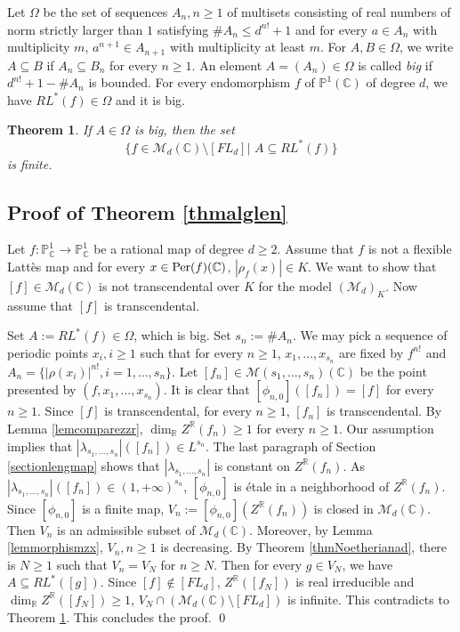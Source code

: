 \documentclass[12pt]{amsart}
\theoremstyle{plain}
\newtheorem{Thm}{Theorem}[section]
\theoremstyle{remark}
\theoremstyle{definition}
\def\R{\mathbb R}
\def\C{\mathbb C}
\def\P{\mathbb P}
\def\sM{\mathcal M}
\def\Om{\Omega}
\def\la{\lambda}
\begin{document}
\medskip



Let $\Om$ be the set of sequences $A_n, n\geq 1$ of multisets consisting of real numbers of norm strictly larger than $1$  satisfying $\#A_n\leq d^{n!}+1$ 
and for every $a\in A_n$ with multiplicity $m$, $a^{n+1}\in A_{n+1}$ with multiplicity at least $m$.
For $A,B\in \Om$, we write $A\subseteq B$ if $A_n\subseteq B_n$ for every $n\geq 1$.
An element $A=(A_n)\in \Om$ is called \emph{big} if $d^{n!}+1-\#A_n$ is bounded. 
For every endomorphism $f$ of $\P^1(\C)$ of degree $d$, we have $RL^*(f)\in \Om$ and it is big.


\begin{Thm}\cite[Theorem 8.25]{Ji2023}\label{thmbigspecrig}
If $A\in \Om$ is big, 
then the set 
$$\{f\in \sM_d(\C)\setminus [FL_d]|\,\, A\subseteq RL^*(f)\}$$ is finite.
\end{Thm}


\subsection{Proof of Theorem \ref{thmalglen}}
Let $f: \P_{\C}^1\to \P_{\C}^1$ be a rational map of degree $d\geq 2$.
Assume that  $f$ is not a flexible Latt\`es map and  for every $x\in {\rm Per}(f)(\C)$, $|\rho_f(x)|\in K$. 
We want to show that $[f]\in \sM_d(\C)$ is not transcendental over $K$ for the model $(\sM_d)_K.$
Now assume that $[f]$ is transcendental.
\medskip

Set $A:=RL^*(f)\in \Om$, which is big. Set $s_n:=\#A_n.$ We may pick a sequence of periodic points $x_i, i\geq 1$ such that
for every $n\geq 1$, $x_1,\dots, x_{s_n}$ are fixed by $f^{n!}$ and $A_n=\{|\rho(x_i)|^{n!}, i=1,\dots, s_n\}.$
Let $[f_n]\in \sM(s_1,\dots,s_n)(\C)$ be the point presented by $(f, x_1,\dots, x_{s_n}).$
It is clear that $[\phi_{n,0}]([f_n])=[f]$ for every $n\geq 1$. Since 
$[f]$ is transcendental, for every $n\geq 1$, $[f_n]$ is transcendental. By Lemma \ref{lemcomparezzr}, $\dim_{\R}Z^{\R}(f_n)\geq 1$ for every $n\geq 1.$
Our assumption implies that $|\la_{s_1,\dots, s_n}|([f_n])\in L^{s_n}$.
The last paragraph of Section \ref{sectionlengmap} shows that $|\la_{s_1,\dots, s_n}|$ is constant on $Z^{\R}(f_n).$
As $|\la_{s_1,\dots, s_n}|([f_n])\in (1,+\infty)^{s_n}$, $[\phi_{n,0}]$ is \'etale in a neighborhood of $Z^{\R}(f_n).$ 
Since $[\phi_{n,0}]$ is a finite map, $V_n:=[\phi_{n,0}](Z^{\R}(f_n))$ is closed in $\sM_d(\C)$.
Then $V_n$ is an admissible subset of $\sM_d(\C)$.
Moreover, by Lemma \ref{lemmorphismzx},
$V_n, n\geq 1$ is decreasing.  By Theorem \ref{thmNoetherianad}, there is $N\geq 1$ such that 
$V_n=V_N$ for $n\geq N.$ 
Then for every $g\in V_N$, we have $A\subseteq RL^*([g]).$
Since $[f]\not\in [FL_d]$, $Z^{\R}([f_N])$
is real irreducible and $\dim_{\R}Z^{\R}([f_N])\geq 1$, $V_N\cap (\sM_d(\C)\setminus [FL_d])$ is infinite. 
This contradicts to Theorem \ref{thmbigspecrig}. This concludes the proof.
\qed
\end{document}
